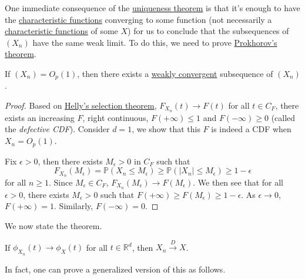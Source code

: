 One immediate consequence of the \hyperref[thm:characteristic-function-uniqueness]{uniqueness theorem} is that it's enough to have the \hyperref[def:characteristic-function]{characteristic functions} converging to some function (not necessarily a \hyperref[def:characteristic-function]{characteristic functions} of some \(X\)) for us to conclude that the subsequences of \((X_n)\) have the same weak limit. To do this, we need to prove \hyperref[thm:Prokhorov]{Prokhorov's theorem}.

\begin{theorem}\label{thm:Prokhorov}
	If \((X_n) = O_p(1)\), then there exists a \hyperref[def:converge-weakly]{weakly convergent} subsequence of \((X_n)\).
\end{theorem}
\begin{proof}%
	Based on \href{https://en.wikipedia.org/wiki/Helly%27s_selection_theorem}{Helly's selection theorem}, \(F_{X_n}(t) \to F(t)\) for all \(t \in C_F\), there exists an increasing \(F\), right continuous, \(F(+\infty ) \leq 1\) and \(F(-\infty ) \geq 0\) (called the \emph{defective CDF}). Consider \(d = 1\), we show that this \(F\) is indeed a CDF when \(X_n = O_p(1)\).

	Fix \(\epsilon > 0\), then there exists \(M_{\epsilon } > 0\) in \(C_F\) such that
	\[
		F_{X_n}(M_{\epsilon } )
		=\mathbb{P} (X_n \leq M_{\epsilon } )
		\geq \mathbb{P} (\vert X_n \vert \leq M_{\epsilon } )
		\geq 1 - \epsilon
	\]
	for all \(n \geq 1\). Since \(M_{\epsilon } \in C_F\), \(F_{X_n}(M_{\epsilon } ) \to F(M_{\epsilon } )\). We then see that for all \(\epsilon > 0\), there exists \(M_{\epsilon } > 0 \) such that \(F(+\infty ) \geq F(M_{\epsilon } ) \geq 1 - \epsilon \). As \(\epsilon \to 0\), \(F(+\infty ) = 1\). Similarly, \(F(-\infty ) = 0\).
\end{proof}

We now state the theorem.

\begin{theorem}
	If \(\phi _{X_n}(t) \to \phi _X(t)\) for all \(t \in \mathbb{R} ^d\), then \(X_n \overset{D}{\to } X\).
\end{theorem}

In fact, one can prove a generalized version of this as follows.

